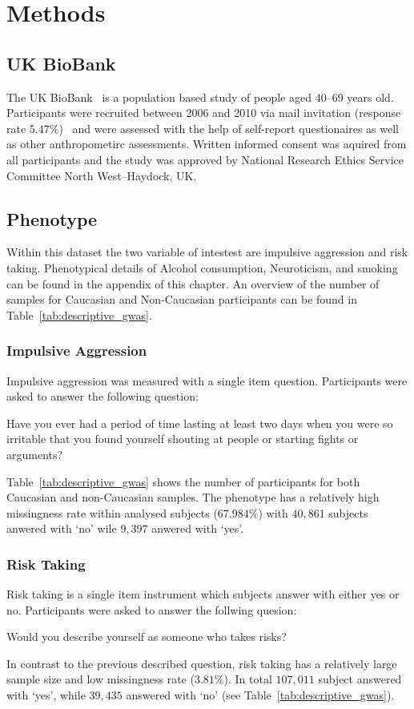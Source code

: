 \section{Methods}
\label{sec:methods}

\subsection{UK BioBank}
\label{sub:uk_biobank}
The UK BioBank~\cite{Allen2014} is a population based study of people aged 40--69 years old. 
Participants were recruited between 2006 and 2010 via mail invitation (response rate $5.47\%$)~\cite{Sudlow2015} and were assessed with the help of self-report questionaires as well as other anthropometirc assessments.
Written informed consent was aquired from all participants and the study was approved by National Research Ethics Service Committee North West–Haydock, UK\@.

\subsection{Phenotype}
\label{sub:phenotype}

Within this dataset the two variable of intestest are impulsive aggression and risk taking.
Phenotypical details of  Alcohol consumption, Neuroticism, and smoking can be found in the appendix of this chapter. 
An overview of the number of samples for Caucasian and Non-Caucasian participants can be found in Table~\ref{tab:descriptive_gwas}.

\subsubsection{Impulsive Aggression}
\label{ssub:impulsive_aggression}
Impulsive aggression was measured with a single item question.
Participants were asked to answer the following question:
\begin{displayquote}
  Have you ever had a period of time lasting at least two days when you were so irritable that you found yourself shouting at people or starting fights or arguments?
\end{displayquote}
Table~\ref{tab:descriptive_gwas} shows the number of participants for both Caucasian and non-Caucasian samples.
The phenotype has a relatively high missingness rate within analysed subjects ($67.984\%$) with $40,861$ subjects anwered with `no' wile $9,397$ anwered with `yes'.

\subsubsection{Risk Taking}
\label{ssub:risk_taking}
Risk taking is a single item instrument which subjects answer with either yes or no.
Participants were asked to answer the follwing quesion:
\begin{displayquote}
  Would you describe yourself as someone who takes risks?
\end{displayquote}
In contrast to the previous described question, risk taking has a relatively large sample size and low missingness rate ($3.81\%$).
In total $107,011$ subject answered with `yes', while $39,435$ answered with `no' (see Table~\ref{tab:descriptive_gwas}).

